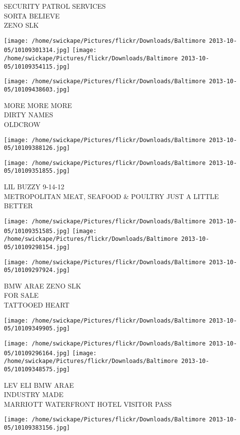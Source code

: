 \documentclass[10pt,letterpaper]{article}
\begin{document}
SECURITY PATROL SERVICES\\
SORTA BELIEVE\\
ZENO SLK
\pagebreak

\texttt{[image: /home/swickape/Pictures/flickr/Downloads/Baltimore 2013-10-05/10109301314.jpg]}
\texttt{[image: /home/swickape/Pictures/flickr/Downloads/Baltimore 2013-10-05/10109354115.jpg]}

\texttt{[image: /home/swickape/Pictures/flickr/Downloads/Baltimore 2013-10-05/10109438603.jpg]}

MORE MORE MORE\\
DIRTY NAMES\\
OLDCROW
\pagebreak

\texttt{[image: /home/swickape/Pictures/flickr/Downloads/Baltimore 2013-10-05/10109388126.jpg]}

\vspace{0.25in}
\texttt{[image: /home/swickape/Pictures/flickr/Downloads/Baltimore 2013-10-05/10109351855.jpg]}

LIL BUZZY 9{-}14{-}12\\
METROPOLITAN MEAT, SEAFOOD \& POULTRY JUST A LITTLE BETTER
\pagebreak

\texttt{[image: /home/swickape/Pictures/flickr/Downloads/Baltimore 2013-10-05/10109351585.jpg]}
\texttt{[image: /home/swickape/Pictures/flickr/Downloads/Baltimore 2013-10-05/10109298154.jpg]}

\texttt{[image: /home/swickape/Pictures/flickr/Downloads/Baltimore 2013-10-05/10109297924.jpg]}

BMW ARAE ZENO SLK\\
FOR SALE\\
TATTOOED HEART
\pagebreak

\texttt{[image: /home/swickape/Pictures/flickr/Downloads/Baltimore 2013-10-05/10109349905.jpg]}

\vspace{0.25in}
\texttt{[image: /home/swickape/Pictures/flickr/Downloads/Baltimore 2013-10-05/10109296164.jpg]}
\texttt{[image: /home/swickape/Pictures/flickr/Downloads/Baltimore 2013-10-05/10109348575.jpg]}

LEV ELI BMW ARAE\\
INDUSTRY MADE\\
MARRIOTT WATERFRONT HOTEL VISITOR PASS
\pagebreak

\texttt{[image: /home/swickape/Pictures/flickr/Downloads/Baltimore 2013-10-05/10109383156.jpg]}
\end{document}
